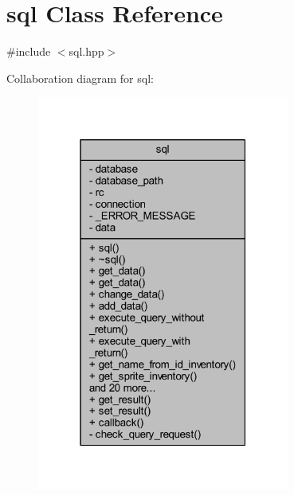 \hypertarget{classsql}{}\section{sql Class Reference}
\label{classsql}


{\ttfamily \#include $<$sql.\+hpp$>$}



Collaboration diagram for sql\+:
\nopagebreak
\begin{figure}[H]
\begin{center}
\leavevmode
\includegraphics[width=235pt]{classsql__coll__graph}
\end{center}
\end{figure}

